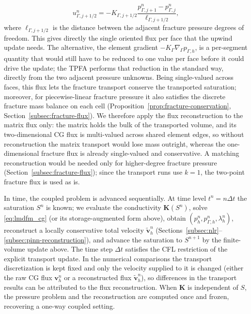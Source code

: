 \documentclass[a4paper,fleqn]{cas-sc}
\newcommand{\Kmat}{\mathbf{K}}
\newcommand{\vflux}{\mathbf{v}}
\begin{document}
\[
  u_{\Gamma,j+1/2}^{n}
  =
  -K_{\Gamma,j+1/2}
  \frac{p_{\Gamma,j+1}^n-p_{\Gamma,j}^n}{\ell_{\Gamma,j+1/2}},
\]
where \(\ell_{\Gamma,j+1/2}\) is the distance between the adjacent fracture
pressure degrees of freedom. This gives directly the single oriented flux per face
that the upwind update needs. The alternative, the element gradient
\(-K_\Gamma\nabla_\Gamma p_{\Gamma,h}\), is a per-segment quantity that would still
have to be reduced to one value per face before it could drive the update; the TPFA
performs that reduction in the standard way, directly from the two adjacent
pressure unknowns. Being
single-valued across faces, this flux lets the fracture transport conserve the
transported saturation; moreover, for piecewise-linear fracture
pressure it also satisfies the discrete fracture mass balance on each cell
(Proposition~\ref{prop:fracture-conservation}, Section~\ref{subsec:fracture-flux}).
We therefore apply the flux reconstruction to the matrix flux
only: the matrix holds the bulk of the transported volume, and its two-dimensional
CG flux is multi-valued across shared element edges, so without reconstruction the
matrix transport would lose mass outright, whereas the one-dimensional fracture
flux is already single-valued and conservative.
A matching reconstruction would be needed only for higher-degree
fracture pressure (Section~\ref{subsec:fracture-flux}); since the transport runs use
\(k=1\), the two-point fracture flux is used as is.

In time, the coupled problem is advanced sequentially. At time level
\(t^n=n\Delta t\) the saturation \(S^n\) is known; we evaluate the conductivity
\(\Kmat(S^n)\), solve \eqref{eq:lmdfm_cg} (or its storage-augmented form above),
obtain \((p_h^n,p_{\Gamma,h}^n,\lambda_h^n)\), reconstruct a locally conservative
total velocity \(\widetilde{\vflux}_h^n\)
(Sections~\ref{subsec:nlr}--\ref{subsec:pinn-reconstruction}), and advance the
saturation to \(S^{n+1}\) by the finite-volume update above. The time step
\(\Delta t\) satisfies the CFL restriction of the explicit transport update. In the
numerical comparisons the transport discretization is kept fixed and only the
velocity supplied to it is changed (either the raw CG flux \(\vflux_h^n\) or a
reconstructed flux \(\widetilde{\vflux}_h^n\)), so differences in the transport
results can be attributed to the flux reconstruction. When \(\Kmat\) is independent
of \(S\), the pressure problem and the reconstruction are computed once and frozen,
recovering a one-way coupled setting.
\end{document}
